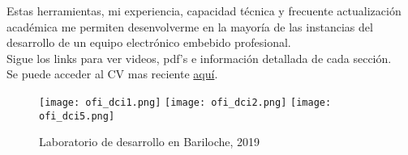 Estas herramientas, mi experiencia, capacidad técnica y frecuente actualización académica me
permiten desenvolverme en la mayoría de las instancias del desarrollo de un
equipo electrónico embebido profesional.\\
Sigue los links para ver videos, pdf's e información detallada de cada sección.\\
Se puede acceder al CV mas reciente \href{\linkgithubcvpdf}{aquí}.\\
  \begin{figure}
      \begin{center}
         \texttt{[image: ofi\_dci1.png]}
         \texttt{[image: ofi\_dci2.png]}
         \texttt{[image: ofi\_dci5.png]}
      \end{center}
      \label{fig:ofi_dci}
      \caption{Laboratorio de desarrollo en Bariloche, 2019}
   \end{figure}
\pagebreak


